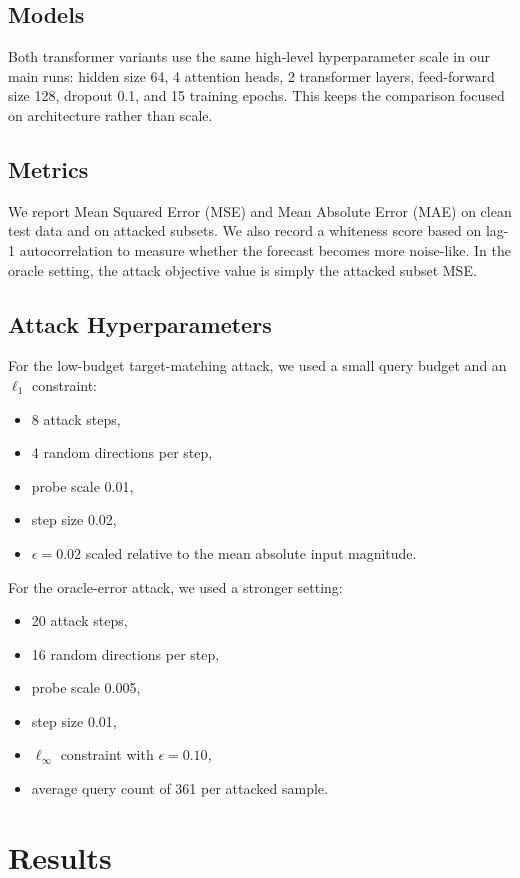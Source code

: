 \documentclass[11pt]{article}
\begin{document}
\subsection{Models}
Both transformer variants use the same high-level hyperparameter scale in our main runs: hidden size 64, 4 attention heads, 2 transformer layers, feed-forward size 128, dropout 0.1, and 15 training epochs. This keeps the comparison focused on architecture rather than scale.

\subsection{Metrics}
We report Mean Squared Error (MSE) and Mean Absolute Error (MAE) on clean test data and on attacked subsets. We also record a whiteness score based on lag-1 autocorrelation to measure whether the forecast becomes more noise-like. In the oracle setting, the attack objective value is simply the attacked subset MSE.

\subsection{Attack Hyperparameters}
For the low-budget target-matching attack, we used a small query budget and an $\ell_1$ constraint:
\begin{itemize}
  \item 8 attack steps,
  \item 4 random directions per step,
  \item probe scale 0.01,
  \item step size 0.02,
  \item $\epsilon=0.02$ scaled relative to the mean absolute input magnitude.
\end{itemize}

For the oracle-error attack, we used a stronger setting:
\begin{itemize}
  \item 20 attack steps,
  \item 16 random directions per step,
  \item probe scale 0.005,
  \item step size 0.01,
  \item $\ell_\infty$ constraint with $\epsilon=0.10$,
  \item average query count of 361 per attacked sample.
\end{itemize}

\section{Results}
\end{document}
